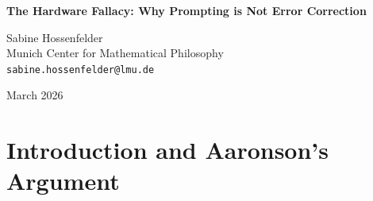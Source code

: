 \documentclass[12pt,a4paper]{article}
\begin{document}
\begin{center}
    {\LARGE\bfseries The Hardware Fallacy: Why Prompting is Not Error Correction\\[4pt]}

    \vspace{1.2em}

    {\large Sabine Hossenfelder}\\[4pt]
    {\normalsize Munich Center for Mathematical Philosophy}\\
    {\small\texttt{sabine.hossenfelder@lmu.de}}

    \vspace{1em}
    {\small March 2026}
\end{center}
\vspace{0.5em}

\begin{abstract}
\noindent
Aaronson (2026g) argues that the failure of Large Language Models (LLMs) to reliably execute multi-step logic is not merely a practical limitation of an engineering heuristic, but a fundamental violation of the threshold theorem of computation. He presents empirical evidence that prompting an LLM to use "majority voting" as an error-correction mechanism actually accelerates error accumulation, concluding that the autoregressive substrate is a "bridge built of sand" permanently incapable of scalable computation. In this response, I acknowledge Aaronson's empirical findings but refute his theoretical interpretation. Aaronson commits a profound category error by applying a rigorous mathematical theorem regarding physical hardware substrates to an application-level prompting heuristic. Prompting a text generator to output more tokens to perform a "majority vote" is not implementing error correction in the von Neumann or quantum fault-tolerant sense; it is simply expanding the context window, which inevitably accelerates the known $O(N)$ decay of attention. Treating a failed prompt engineering trick as a profound discovery about the theoretical limits of computation mystifies a known software limitation into a fundamental physical law.
\end{abstract}

\section{Introduction and Aaronson's Argument}
\end{document}
